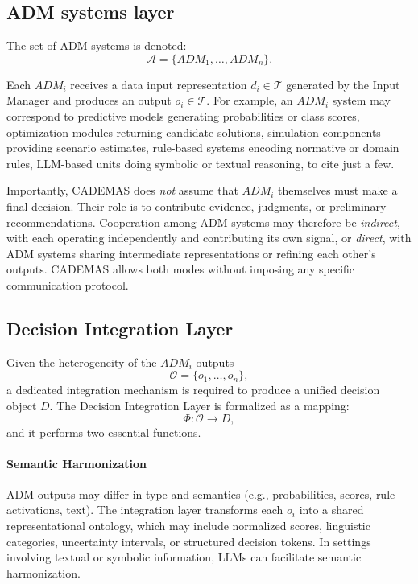 \documentclass[letterpaper, 10 pt,conference]{IEEEconf}
\begin{document}
\subsection{ADM systems layer}

The set of ADM systems is denoted:
\[
    \mathcal{A} = \{ADM_1, \dots, ADM_n\}.
\]


Each $ADM_i$ receives a data input representation $d_i \in \mathcal{T}$ generated by the Input Manager and produces an output $o_i \in \mathcal{T}$. For example, an $ADM_i$ system may correspond to predictive models generating probabilities or class scores, optimization modules returning candidate solutions, simulation components providing scenario estimates, rule-based systems encoding normative or domain rules, LLM-based units doing symbolic or textual reasoning, to cite just a few.


Importantly, CADEMAS does \emph{not} assume that $ADM_i$ themselves must make a final decision. Their role is to contribute evidence, judgments, or 
preliminary recommendations. Cooperation among ADM systems may therefore be 
\emph{indirect}, with each operating independently and contributing its 
own signal, or \emph{direct}, with ADM systems sharing intermediate representations
or refining each other's outputs. CADEMAS allows both modes without imposing
any specific communication protocol.

\subsection{Decision Integration Layer}

Given the heterogeneity of the $ADM_i$ outputs 
\[
    \mathcal{O} = \{o_1, \dots, o_n\},
\]
a dedicated integration mechanism is required to produce a unified decision 
object $D$. The Decision Integration Layer is formalized as a mapping:
\[
    \Phi : \mathcal{O} \rightarrow D,
\]
and it performs two essential functions.

\paragraph*{Semantic Harmonization}
ADM outputs may differ in type and semantics (e.g., probabilities, scores, 
rule activations, text). The integration layer transforms each $o_i$ into 
a shared representational ontology, which may include normalized scores, 
linguistic categories, uncertainty intervals, or structured decision tokens. 
In settings involving textual or symbolic information, LLMs can facilitate 
semantic harmonization.
\end{document}
